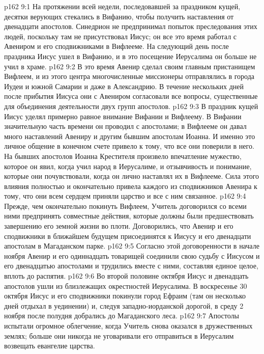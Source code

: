 \vs p162 9:1 На протяжении всей недели, последовавшей за праздником кущей, десятки верующих стекались в Вифанию, чтобы получить наставления от двенадцати апостолов. Синедрион не предпринимал попыток преследования этих людей, поскольку там не присутствовал Иисус; он все это время работал с Авениром и его сподвижниками в Вифлееме. На следующий день после праздника Иисус ушел в Вифанию, и в это посещение Иерусалима он больше не учил в храме.
\vs p162 9:2 \pc В это время Авенир сделал своим главным пристанищем Вифлеем, и из этого центра многочисленные миссионеры отправлялись в города Иудеи и южной Самарии и даже в Александрию. В течение нескольких дней после прибытия Иисуса они с Авениром согласовали все вопросы, существенные для объединения деятельности двух групп апостолов.
\vs p162 9:3 В праздник кущей Иисус уделял примерно равное внимание Вифании и Вифлеему. В Вифании значительную часть времени он проводил с апостолами; в Вифлееме он давал много наставлений Авениру и другим бывшим апостолам Иоанна. И именно это личное общение в конечном счете привело к тому, что все они поверили в него. На бывших апостолов Иоанна Крестителя произвело впечатление мужество, которое он явил, когда учил народ в Иерусалиме, и отзывчивость и понимание, которые они почувствовали, когда он лично наставлял их в Вифлееме. Сила этого влияния полностью и окончательно привела каждого из сподвижников Авенира к тому, что они всем сердцем приняли царство и все с ним связанное.
\vs p162 9:4 \pc Прежде, чем окончательно покинуть Вифлеем, Учитель договорился со всеми ними предпринять совместные действия, которые должны были предшествовать завершению его земной жизни во плоти. Договорились, что Авенир и его сподвижники в ближайшем будущем присоединятся к Иисусу и его двенадцати апостолам в Магаданском парке.
\vs p162 9:5 Согласно этой договоренности в начале ноября Авенир и его одиннадцать товарищей соединили свою судьбу с Иисусом и его двенадцатью апостолами и трудились вместе с ними, составляя единое целое, вплоть до распятия.
\vs p162 9:6 Во второй половине октября Иисус и двенадцать апостолов ушли из близлежащих окрестностей Иерусалима. В воскресенье 30 октября Иисус и его сподвижники покинули город Ефраим (там он несколько дней отдыхал в уединении) и, следуя западно\hyp{}иорданской дорогой, в среду 2 ноября после полудня добрались до Магаданского леса.
\vs p162 9:7 Апостолы испытали огромное облегчение, когда Учитель снова оказался в дружественных землях; больше они никогда не уговаривали его отправиться в Иерусалим возвещать евангелие царства.
